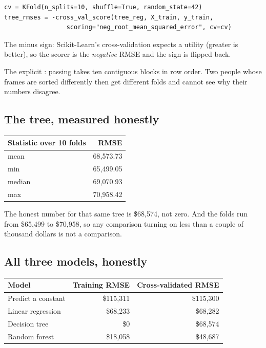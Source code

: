 \documentclass[11pt,a4paper]{article}
\begin{document}
\begin{keybox}[title={Two details in the call that are not decoration}]
\begin{verbatim}
cv = KFold(n_splits=10, shuffle=True, random_state=42)
tree_rmses = -cross_val_score(tree_reg, X_train, y_train,
                 scoring="neg_root_mean_squared_error", cv=cv)
\end{verbatim}
The minus sign: Scikit-Learn's cross-validation expects a utility (greater is
better), so the scorer is the \emph{negative} RMSE and the sign is flipped
back.

The explicit : passing  takes ten contiguous blocks in
row order. Two people whose frames are sorted differently then get different
folds and cannot see why their numbers disagree.
\end{keybox}

\subsection{The tree, measured honestly}

\begin{center}
\small
\begin{tabular}{lr}
\toprule
\textbf{Statistic over 10 folds} & \textbf{RMSE} \\
\midrule
mean   & 68{,}573.73 \\
min    & 65{,}499.05 \\
median & 69{,}070.93 \\
max    & 70{,}958.42 \\
\bottomrule
\end{tabular}
\end{center}

The honest number for that same tree is \$68{,}574, not zero. And the folds run
from \$65{,}499 to \$70{,}958, so any comparison turning on less than a couple
of thousand dollars is not a comparison.

\subsection{All three models, honestly}

\begin{center}
\small
\begin{tabular}{lrr}
\toprule
\textbf{Model} & \textbf{Training RMSE} & \textbf{Cross-validated RMSE} \\
\midrule
Predict a constant & \$115{,}311 & \$115{,}300 \\
Linear regression  & \$68{,}233  & \$68{,}282 \\
Decision tree      & \$0         & \$68{,}574 \\
Random forest      & \$18{,}058  & \$48{,}687 \\
\bottomrule
\end{tabular}
\end{center}
\end{document}
